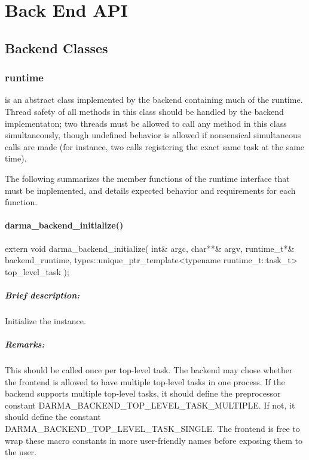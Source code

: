 \chapter{Back End API}
\label{chap:back_end}



\section{Backend Classes}
\subsection{{runtime}}
 is an abstract class implemented by the backend containing
much of the runtime.  Thread safety of all methods in this class should be handled by the backend implementaton;
two threads must  be allowed to call any method in this class simultaneously, though undefined behavior
is allowed if nonsensical simultaneous calls are made (for instance, two calls registering the exact same
task at the same time).

The following summarizes the member functions of the runtime interface that
must be implemented, and details expected behavior and requirements for each
function.

\subsubsection{darma\_backend\_initialize()}
\begin{CppCode}
extern void
darma_backend_initialize(
  int& argc, char**& argv,
  runtime_t*& backend_runtime,
  types::unique_ptr_template<typename runtime_t::task_t> top_level_task
);
\end{CppCode}

\paragraph{Brief description:} Initialize the  instance.
 
\paragraph{Remarks:} This should be called once per top-level task.  The backend may chose whether
  the frontend is allowed to have multiple top-level tasks in one process.  If the backend
   supports multiple top-level tasks, it should define the preprocessor constant
   DARMA\_BACKEND\_TOP\_LEVEL\_TASK\_MULTIPLE.  If not, it should define the constant
   DARMA\_BACKEND\_TOP\_LEVEL\_TASK\_SINGLE.  The frontend is free to wrap these macro constants
   in more user-friendly names before exposing them to the user.
 
